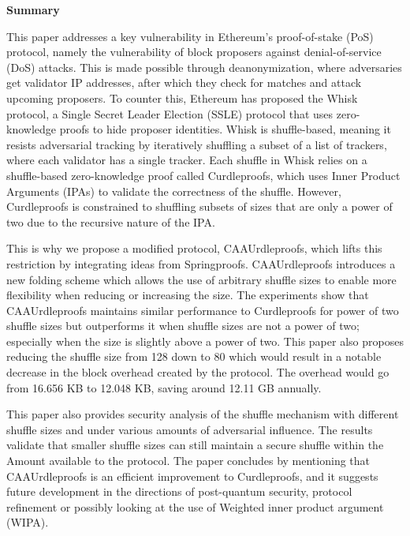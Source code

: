\onecolumn     %
\thispagestyle{empty}

\begin{center}
    \begin{tcolorbox}[
        width=\dimexpr\paperwidth - 2in\relax,  %
        colback=white,                          %
        colframe=white,                         %
        left=60pt, right=60pt, top=10pt, bottom=10pt, %
        boxrule=0.8pt, %
        fontupper=\large
    ]
        \textbf{\large Summary}%

This paper addresses a key vulnerability in Ethereum’s proof-of-stake (PoS) protocol, namely the vulnerability of block proposers against denial-of-service (DoS) attacks.
This is made possible through deanonymization, where adversaries get validator IP addresses, after which they check for matches and attack upcoming proposers.
To counter this, Ethereum has proposed the Whisk protocol, a Single Secret Leader Election (SSLE) protocol that uses zero-knowledge proofs to hide proposer identities.
Whisk is shuffle-based, meaning it resists adversarial tracking by iteratively shuffling a subset of a list of trackers, where each validator has a single tracker.
Each shuffle in Whisk relies on a shuffle-based zero-knowledge proof called Curdleproofs, which uses Inner Product Arguments (IPAs) to validate the correctness of the shuffle.
However, Curdleproofs is constrained to shuffling subsets of sizes that are only a power of two due to the recursive nature of the IPA.


This is why we propose a modified protocol, CAAUrdleproofs, which lifts this restriction by integrating ideas from Springproofs.
CAAUrdleproofs introduces a new folding scheme which allows the use of arbitrary shuffle sizes to enable more flexibility when reducing or increasing the size.
The experiments show that CAAUrdleproofs maintains similar performance to Curdleproofs for power of two shuffle sizes but outperforms it when shuffle sizes are not a power of two; especially when the size is slightly above a power of two.
This paper also proposes reducing the shuffle size from 128 down to 80 which would result in a notable decrease in the block overhead created by the protocol.
The overhead would go from 16.656 KB to 12.048 KB, saving around 12.11 GB annually.


This paper also provides security analysis of the shuffle mechanism with different shuffle sizes and under various amounts of adversarial influence.
The results validate that smaller shuffle sizes can still maintain a secure shuffle within the Amount available to the protocol.
The paper concludes by mentioning that CAAUrdleproofs is an efficient improvement to Curdleproofs, and it suggests future development in the directions of post-quantum security, protocol refinement or possibly looking at the use of Weighted inner product argument (WIPA).



        \end{tcolorbox}
    \end{center}